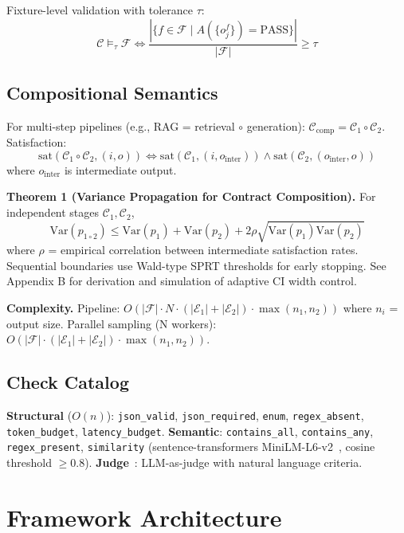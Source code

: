 \documentclass[sigconf]{acmart}
\begin{document}
Fixture-level validation with tolerance \( \tau \):
\[
\mathcal{C} \models_\tau \mathcal{F} \iff \frac{|\{f \in \mathcal{F} \mid A(\{o_j^f\}) = \text{PASS}\}|}{|\mathcal{F}|} \geq \tau
\]

\subsection{Compositional Semantics}

For multi-step pipelines (e.g., RAG = retrieval \(\circ\) generation): \( \mathcal{C}_{\text{comp}} = \mathcal{C}_1 \circ \mathcal{C}_2 \). Satisfaction:
\[
\text{sat}(\mathcal{C}_1 \circ \mathcal{C}_2, (i, o)) \iff \text{sat}(\mathcal{C}_1, (i, o_{\text{inter}})) \wedge \text{sat}(\mathcal{C}_2, (o_{\text{inter}}, o))
\]
where \( o_{\text{inter}} \) is intermediate output.

\textbf{Theorem 1 (Variance Propagation for Contract Composition).} For independent stages \( \mathcal{C}_1, \mathcal{C}_2 \),
\[
\text{Var}(p_{1 \circ 2}) \leq \text{Var}(p_1) + \text{Var}(p_2) + 2\rho\sqrt{\text{Var}(p_1)\text{Var}(p_2)}
\]
where \( \rho \) = empirical correlation between intermediate satisfaction rates. Sequential boundaries use Wald-type SPRT thresholds for early stopping. See Appendix B for derivation and simulation of adaptive CI width control.

\textbf{Complexity.} Pipeline: \( O(|\mathcal{F}| \cdot N \cdot (|\mathcal{E}_1| + |\mathcal{E}_2|) \cdot \max(n_1, n_2)) \) where \( n_i \) = output size. Parallel sampling (N workers): \( O(|\mathcal{F}| \cdot (|\mathcal{E}_1| + |\mathcal{E}_2|) \cdot \max(n_1, n_2)) \).

\subsection{Check Catalog}

\textbf{Structural} (\( O(n) \)): \texttt{json\_valid}, \texttt{json\_required}, \texttt{enum}, \texttt{regex\_absent}, \texttt{token\_budget}, \texttt{latency\_budget}. \textbf{Semantic}: \texttt{contains\_all}, \texttt{contains\_any}, \texttt{regex\_present}, \texttt{similarity} (sentence-transformers MiniLM-L6-v2~\cite{reimers2019sentencebert}, cosine threshold \( \geq 0.8 \)). \textbf{Judge}~\cite{zheng2023judging}: LLM-as-judge with natural language criteria.

\section{Framework Architecture}
\end{document}
